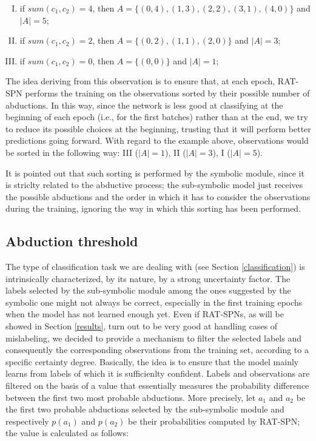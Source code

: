 \begin{enumerate}[I.]
	\item if $sum(\mathit{c}_1,\mathit{c}_2) = 4$, then $\mathit{A} = \{(0,4), (1,3), (2,2), (3,1), (4,0)\}$ and $|A|=5$;
	\item if $sum(\mathit{c}_1,\mathit{c}_2) = 2$, then $\mathit{A} = \{(0,2), (1,1), (2,0)\}$ and $|A|=3$;
	\item if $sum(\mathit{c}_1,\mathit{c}_2) = 0$, then $\mathit{A} = \{(0,0)\}$ and $|A|=1$;
\end{enumerate}
The idea deriving from this observation is to ensure that, at each epoch, RAT-SPN performs the training on the observations sorted by their possible number of abductions. In this way, since the network is less good at classifying at the beginning of each epoch (i.e., for the first batches) rather than at the end, we try to reduce its possible choices at the beginning, trusting that it will perform better predictions going forward. With regard to the example above, observations would be sorted in the following way: III ($|A|=1$), II ($|A|=3$), I ($|A|=5$).

It is pointed out that such sorting is performed by the symbolic module, since it is striclty related to the abductive process; the sub-symbolic model just receives the possible abductions and the order in which it has to consider the observations during the training, ignoring the way in which this sorting has been performed.  

\subsection{Abduction threshold}
\label{abd-threshold}
The type of classification task we are dealing with (see Section \ref{classification}) is intrinsically characterized, by its nature, by a strong uncertainty factor. The labels selected by the sub-symbolic module among the ones suggested by the symbolic one might not always be correct, especially in the first training epochs when the model has not learned enough yet. Even if RAT-SPNs, as will be showed in Section \ref{results}, turn out to be very good at handling cases of mislabeling, we decided to provide a mechanism to filter the selected labels and consequently the corresponding observations from the training set, according to a specific certainty degree. Basically, the idea is to ensure that the model mainly learns from labels of which it is sufficienlty confident. Labels and observations are filtered on the basis of a value that essentially measures the probability difference between the first two most probable abductions. More precisely, let $a_1$ and $a_2$ be the first two probable abductions selected by the sub-symbolic module and respectively $p(a_1)$ and $p(a_2)$ be their probabilities computed by RAT-SPN; the value is calculated as follows:


